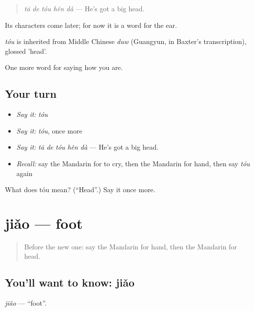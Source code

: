 \begin{quote}
\emph{tā de tóu hěn dà} — He's got a big head.
\end{quote}

Its characters come later; for now it is a word for the ear.

\begin{cousinweb}
\emph{tóu} is inherited from Middle Chinese \emph{duw} (Guangyun, in Baxter's transcription), glossed 'head'.
\end{cousinweb}

\begin{grammarlens}[title={What you've built}]
One more word for saying how you are.
\end{grammarlens}

\subsection*{Your turn}
\begin{itemize}
\raggedright
  \item \emph{Say it:} \emph{tóu}
  \item \emph{Say it:} \emph{tóu}, once more
  \item \emph{Say it:} \emph{tā de tóu hěn dà} — He's got a big head.
  \item \emph{Recall:} say the Mandarin for to cry, then the Mandarin for hand, then say \emph{tóu} again
\end{itemize}

\begin{tcolorbox}[breakable,colback=teal!4,colframe=teal!35!black,title={Before you move on}]
What does tóu mean? (\textquotedblleft{}Head\textquotedblright{}.) Say it once more.
\end{tcolorbox}
\section[jiǎo]{jiǎo — foot}

\label{lesson:ZH-C52-jiao}



\begin{quote}
Before the new one: say the Mandarin for hand, then the Mandarin for head.
\end{quote}

\subsection*{You'll want to know: jiǎo}
\emph{jiǎo} — \textquotedblleft{}foot\textquotedblright{}.

